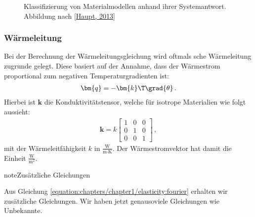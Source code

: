 \documentclass[letterpaper,10pt,german]{jupyterBook}
\let\sphinxpxdimen\pdfpxdimen\else\newdimen\sphinxpxdimen
\begin{document}
\begin{figure}[htbp]
\centering
\capstart

\noindent\sphinxincludegraphics[height=500\sphinxpxdimen]{{Materialklassen}.png}
\caption{Klassifizierung von Materialmodellen anhand ihrer Systemantwort. Abbildung nach {[}\hyperlink{cite.quellen:id7}{Haupt, 2013}{]}}\label{\detokenize{chapters/chapter1/elasticity:materialklassen}}\end{figure}


\subsubsection{Wärmeleitung}
\label{\detokenize{chapters/chapter1/elasticity:warmeleitung}}
\sphinxAtStartPar
Bei der Berechnung der Wärmeleitungsgleichung wird oftmals sche Wärmeleitung zugrunde gelegt. Diese basiert auf der Annahme, dass der Wärmestrom proportional zum negativen Temperaturgradienten ist:
\begin{equation}\label{equation:chapters/chapter1/elasticity:fourier}
\begin{split}\bm{q} = - \bm{k}\T  \grad{\theta} \, .\end{split}
\end{equation}
\sphinxAtStartPar
Hierbei ist \(\bm{k}\) die Konduktivitätstensor, welche für isotrope Materialien wie folgt aussieht:
\begin{equation}\label{equation:chapters/chapter1/elasticity:konduktivitaetsmatrixIsotrop}
\begin{split} \bm{k} = k \begin{bmatrix} 1 & 0 & 0 \\ 0 & 1 & 0 \\ 0 & 0 & 1\end{bmatrix}  \, ,\end{split}
\end{equation}
\sphinxAtStartPar
mit der Wärmeleitfähigkeit \(k\) in \(\frac{\text{W}}{\text{m}\cdot\text{K}}\). Der Wärmestromvektor hat damit die Einheit \(\frac{\text{W}}{\text{m}^2}\).

\begin{sphinxadmonition}{note}{Zusätzliche Gleichungen}

\sphinxAtStartPar
Aus Gleichung \eqref{equation:chapters/chapter1/elasticity:fourier} erhalten wir  zusätzliche Gleichungen. Wir haben jetzt genausoviele Gleichungen wie Unbekannte.
\end{sphinxadmonition}
\end{document}
